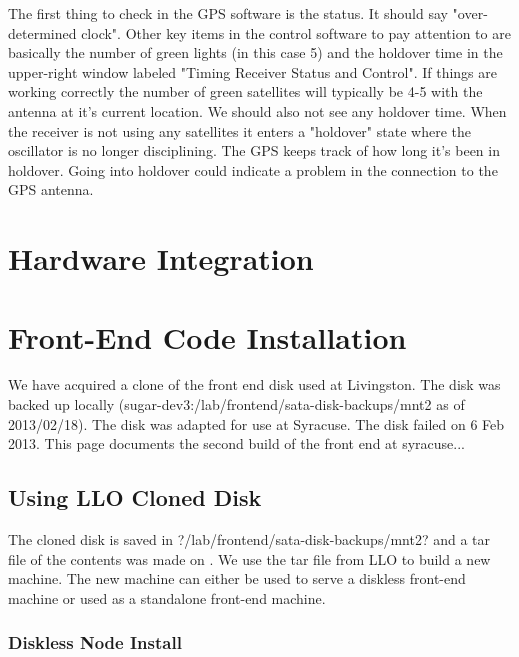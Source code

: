 The first thing to check in the GPS software is the status. It should say "over-determined clock". Other key items in the control software to pay attention to are basically the number of green lights (in this case 5) and the holdover time in the upper-right window labeled "Timing Receiver Status and Control". If things are working correctly the number of green satellites will typically be 4-5 with the antenna at it's current location. We should also not see any holdover time. When the receiver is not using any satellites it enters a "holdover" state where the oscillator is no longer disciplining. The GPS keeps track of how long it's been in holdover. Going into holdover could indicate a problem in the connection to the GPS antenna.


\section{Hardware Integration}

\section{Front-End Code Installation}

We have acquired a clone of the front end disk used at Livingston. The disk was backed up locally (sugar-dev3:/lab/frontend/sata-disk-backups/mnt2 as of 2013/02/18). The disk was adapted for use at Syracuse. The disk failed on 6 Feb 2013. This page documents the second build of the front end at syracuse...




\subsection{Using LLO Cloned Disk}

The cloned disk is saved in \lstin?/lab/frontend/sata-disk-backups/mnt2? and a tar file
of the contents was made on
. We use the tar file from LLO to build a new machine. The new machine
can either be used to serve a diskless front-end machine or used as a standalone front-end
machine.


\subsubsection{Diskless Node Install}


